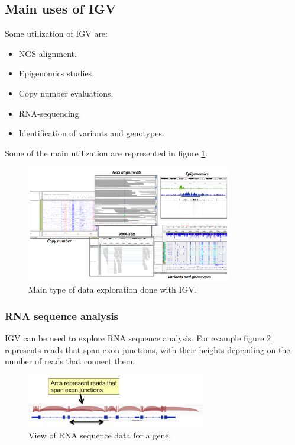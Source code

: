     \subsection{Main uses of IGV}
    Some utilization of IGV are:

    \begin{multicols}{2}
        \begin{itemize}
            \item NGS alignment.
            \item Epigenomics studies.
            \item Copy number evaluations.
            \item RNA-sequencing.
            \item Identification of variants and genotypes.
        \end{itemize}
    \end{multicols}

    Some of the main utilization are represented in figure \ref{fig:IGVusages}.

    \begin{figure}[H]
        \centering
        \includegraphics[width=0.8\textwidth]{usagesIGV.PNG}
        \caption{Main type of data exploration done with IGV.}
        \label{fig:IGVusages}
    \end{figure}

        \subsubsection{RNA sequence analysis}
        IGV can be used to explore RNA sequence analysis.
        For example figure \ref{fig:RNAseq} represents reads that span exon junctions, with their heights depending on the number of reads that connect them.

        \begin{figure}[H]
            \centering
            \includegraphics[width=0.7\textwidth]{RNAseqAlign.PNG}
            \caption{View of RNA sequence data for a gene.}
            \label{fig:RNAseq}
        \end{figure}

